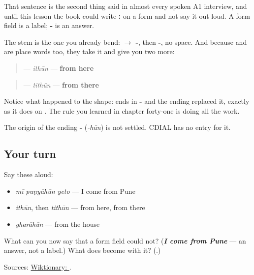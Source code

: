 That sentence is the second thing said in almost every spoken A1 interview, and until this lesson the book could write \textbf{: } on a form and not say it out loud. A form field is a label; \textbf{-} is an answer.

The stem is the one you already bend: \textbf{ $\to$ -}, then \textbf{-}, no space. And because \textbf{} and \textbf{} are place words too, they take it and give you two more:

\begin{quote}
\textbf{} — \emph{ithūn} — \textbf{from here}
\end{quote}

\begin{quote}
\textbf{} — \emph{tithūn} — \textbf{from there}
\end{quote}

Notice what happened to the shape: \textbf{} ends in \textbf{-} and the ending replaced it, exactly as it does on \textbf{}. The rule you learned in chapter forty-one is doing all the work.

\begin{cousinweb}
The origin of the ending \textbf{-} (\emph{-hūn}) is not settled. CDIAL has no entry for it.
\end{cousinweb}

\subsection*{Your turn}
Say these aloud:

\begin{itemize}
\raggedright
  \item \emph{mī puṇyāhūn yeto} — I come from Pune
  \item \emph{ithūn}, then \emph{tithūn} — from here, from there
  \item \emph{gharāhūn} — from the house
\end{itemize}

\begin{tcolorbox}[breakable,colback=teal!4,colframe=teal!35!black,title={Before you move on}]
What can you now say that a form field could not? (\emph{\textbf{I come from Pune}} — an answer, not a label.) What does \textbf{} become with it? (\textbf{}.)

Sources: \href{https://en.wiktionary.org/wiki/\%E0\%A4\%B9\%E0\%A5\%82\%E0\%A4\%A8}{Wiktionary: }.
\end{tcolorbox}
